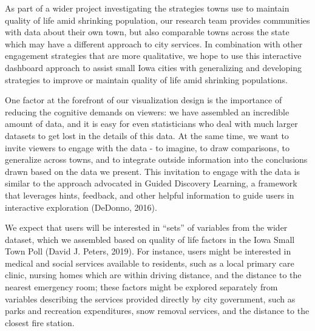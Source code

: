 \documentclass[print]{nuthesis}
\begin{document}
As part of a wider project investigating the strategies towns use to maintain quality of life amid shrinking population, our research team provides communities with data about their own town, but also comparable towns across the state which may have a different approach to city services. In combination with other engagement strategies that are more qualitative, we hope to use this interactive dashboard approach to assist small Iowa cities with generalizing and developing strategies to improve or maintain quality of life amid shrinking populations.

One factor at the forefront of our visualization design is the importance of reducing the cognitive demands on viewers: we have assembled an incredible amount of data, and it is easy for even statisticians who deal with much larger datasets to get lost in the details of this data. At the same time, we want to invite viewers to engage with the data - to imagine, to draw comparisons, to generalize across towns, and to integrate outside information into the conclusions drawn based on the data we present.
This invitation to engage with the data is similar to the approach advocated in Guided Discovery Learning, a framework that leverages hints, feedback, and other helpful information to guide users in interactive exploration (DeDonno, 2016).

We expect that users will be interested in ``sets'' of variables from the wider dataset, which we assembled based on quality of life factors in the Iowa Small Town Poll (David J. Peters, 2019). For instance, users might be interested in medical and social services available to residents, such as a local primary care clinic, nursing homes which are within driving distance, and the distance to the nearest emergency room; these factors might be explored separately from variables describing the services provided directly by city government, such as parks and recreation expenditures, snow removal services, and the distance to the closest fire station.
\end{document}
